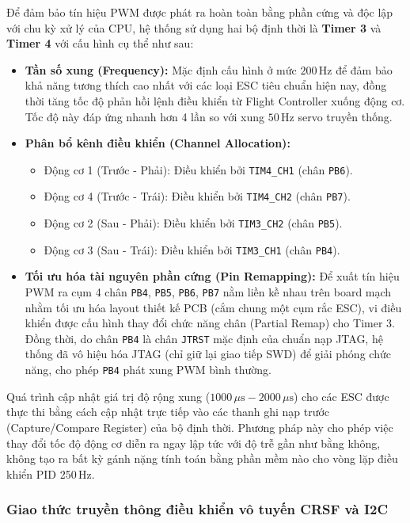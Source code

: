 Để đảm bảo tín hiệu PWM được phát ra hoàn toàn bằng phần cứng và độc lập với chu kỳ xử lý của CPU, hệ thống sử dụng hai bộ định thời là \textbf{Timer 3} và \textbf{Timer 4} với cấu hình cụ thể như sau:
\begin{itemize}
    \item \textbf{Tần số xung (Frequency):} Mặc định cấu hình ở mức $200\,\text{Hz}$ để đảm bảo khả năng tương thích cao nhất với các loại ESC tiêu chuẩn hiện nay, đồng thời tăng tốc độ phản hồi lệnh điều khiển từ Flight Controller xuống động cơ. Tốc độ này đáp ứng nhanh hơn 4 lần so với xung $50\,\text{Hz}$ servo truyền thống.
    \item \textbf{Phân bổ kênh điều khiển (Channel Allocation):} 
    \begin{itemize}
        \item Động cơ 1 (Trước - Phải): Điều khiển bởi \texttt{TIM4\_CH1} (chân \texttt{PB6}).
        \item Động cơ 4 (Trước - Trái): Điều khiển bởi \texttt{TIM4\_CH2} (chân \texttt{PB7}).
        \item Động cơ 2 (Sau - Phải): Điều khiển bởi \texttt{TIM3\_CH2} (chân \texttt{PB5}).
        \item Động cơ 3 (Sau - Trái): Điều khiển bởi \texttt{TIM3\_CH1} (chân \texttt{PB4}).
    \end{itemize}
    \item \textbf{Tối ưu hóa tài nguyên phần cứng (Pin Remapping):} Để xuất tín hiệu PWM ra cụm 4 chân \texttt{PB4}, \texttt{PB5}, \texttt{PB6}, \texttt{PB7} nằm liền kề nhau trên board mạch nhằm tối ưu hóa layout thiết kế PCB (cắm chung một cụm rắc ESC), vi điều khiển được cấu hình thay đổi chức năng chân (Partial Remap) cho Timer 3. Đồng thời, do chân \texttt{PB4} là chân \texttt{JTRST} mặc định của chuẩn nạp JTAG, hệ thống đã vô hiệu hóa JTAG (chỉ giữ lại giao tiếp SWD) để giải phóng chức năng, cho phép \texttt{PB4} phát xung PWM bình thường.
\end{itemize}

Quá trình cập nhật giá trị độ rộng xung ($1000\,\mu\text{s} - 2000\,\mu\text{s}$) cho các ESC được thực thi bằng cách cập nhật trực tiếp vào các thanh ghi nạp trước (Capture/Compare Register) của bộ định thời. Phương pháp này cho phép việc thay đổi tốc độ động cơ diễn ra ngay lập tức với độ trễ gần như bằng không, không tạo ra bất kỳ gánh nặng tính toán bằng phần mềm nào cho vòng lặp điều khiển PID 250\,Hz.

\subsubsection{Giao thức truyền thông điều khiển vô tuyến CRSF và I2C}

